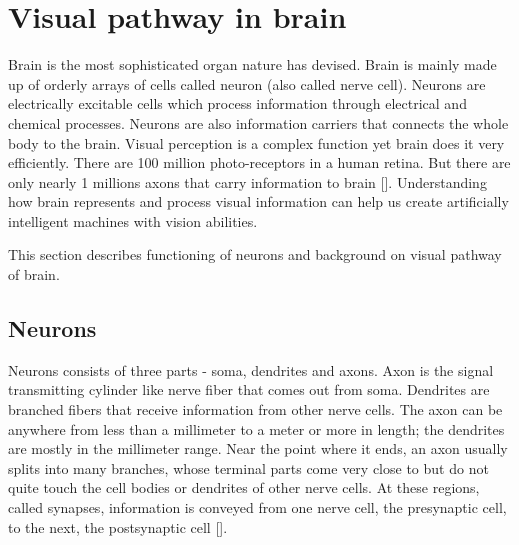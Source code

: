 \documentclass[MTech]{iitmdiss}
\begin{document}
\section{Visual pathway in brain} %
\label{sec:visual_pathway_in_brain}
Brain is the most sophisticated organ nature has devised. Brain is mainly made up of orderly arrays of cells called neuron (also called nerve cell). Neurons are electrically excitable cells which process information through electrical and chemical processes. Neurons are also information carriers that connects the whole body to the brain. Visual perception is a complex function yet brain does it very efficiently. There are 100 million photo-receptors in a human retina. But there are only nearly 1 millions axons that carry information to brain [\cite{bear2007neuroscience}]. Understanding how brain represents and process visual information can help us create artificially intelligent machines with vision abilities.

This section describes functioning of neurons and background on visual pathway of brain.
\subsection{Neurons} %
\label{sub:neurons}
Neurons consists of three parts - soma, dendrites and axons. Axon is the signal transmitting cylinder like nerve fiber that comes out from soma. Dendrites are branched fibers that receive information from other nerve cells. The axon can be anywhere from less than a millimeter to a meter or more in length; the dendrites are mostly in the millimeter range. Near the point where it ends, an axon usually splits into many branches, whose terminal parts come very close to but do not quite touch the cell bodies or dendrites of other nerve cells. At these regions, called synapses, information is conveyed from one nerve cell, the presynaptic cell, to the next, the postsynaptic cell [\cite{hubel1995eye}].
\end{document}
